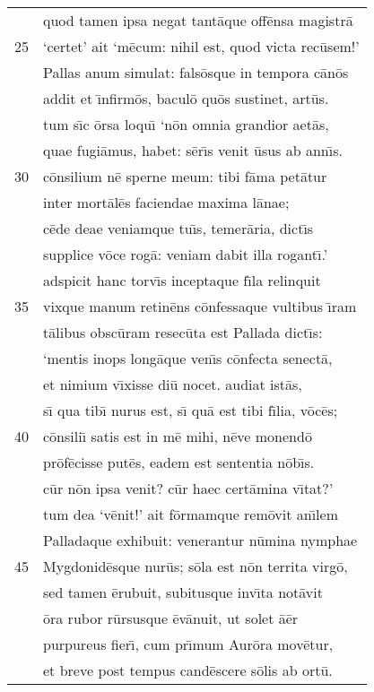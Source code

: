 \documentclass[paper=6in:9in,pagesize=pdftex,
               headinclude=on,footinclude=on,12pt]{scrbook}
\begin{document}
\begin{longtable}[p]{ r l }
 & quod tamen ipsa negat tant\=aque off\=ensa magistr\=a\\ 
25 & `certet' ait `m\=ecum: nihil est, quod victa rec\=usem!'\\ 
 & \indent Pallas anum simulat: fals\=osque in tempora c\=an\=os\\ 
 & addit et \={\i}nfirm\=os, bacul\=o qu\=os sustinet, art\=us.\\ 
 & tum s\={\i}c \=orsa loqu\={\i} `n\=on omnia grandior aet\=as,\\ 
 & quae fugi\=amus, habet: s\=er\={\i}s venit \=usus ab ann\={\i}s.\\ 
30 & c\=onsilium n\=e sperne meum: tibi f\=ama pet\=atur\\ 
 & inter mort\=al\=es faciendae maxima l\=anae;\\ 
 & c\=ede deae veniamque tu\={\i}s, temer\=aria, dict\={\i}s\\ 
 & supplice v\=oce rog\=a: veniam dabit illa rogant\={\i}.'\\ 
 & adspicit hanc torv\={\i}s inceptaque f\={\i}la relinquit\\ 
35 & vixque manum retin\=ens c\=onfessaque vultibus \={\i}ram\\ 
 & t\=alibus obsc\=uram resec\=uta est Pallada dict\={\i}s:\\ 
 & `mentis inops long\=aque ven\={\i}s c\=onfecta senect\=a,\\ 
 & et nimium v\={\i}xisse di\=u nocet. audiat ist\=as,\\ 
 & s\={\i} qua tib\={\i} nurus est, s\={\i} qu\=a est tibi f\={\i}lia, v\=oc\=es;\\ 
40 & c\=onsili\={\i} satis est in m\=e mihi, n\=eve monend\=o\\ 
 & pr\=of\=ecisse put\=es, eadem est sententia n\=ob\={\i}s.\\ 
 & c\=ur n\=on ipsa venit? c\=ur haec cert\=amina v\={\i}tat?'\\ 
 & tum dea `v\=enit!' ait f\=ormamque rem\=ovit an\={\i}lem\\ 
 & Palladaque exhibuit: venerantur n\=umina nymphae\\ 
45 & Mygdonid\=esque nur\=us; s\=ola est n\=on territa virg\=o,\\ 
 & sed tamen \=erubuit, subitusque inv\={\i}ta not\=avit\\ 
 & \=ora rubor r\=ursusque \=ev\=anuit, ut solet \=a\=er\\ 
 & purpureus fier\={\i}, cum pr\={\i}mum Aur\=ora mov\=etur,\\ 
 & et breve post tempus cand\=escere s\=olis ab ort\=u.\\ 

\end{longtable}
\end{document}
